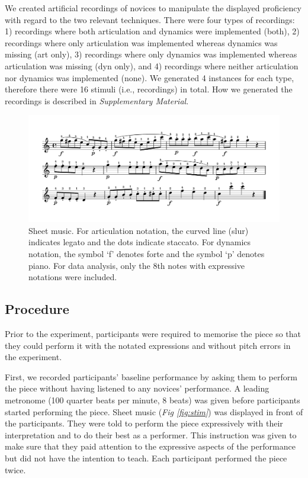 \documentclass[
  man,floatsintext]{apa6}
\begin{document}
We created artificial recordings of novices to manipulate the displayed proficiency with regard to the two relevant techniques. There were four types of recordings: 1) recordings where both articulation and dynamics were implemented (both), 2) recordings where only articulation was implemented whereas dynamics was missing (art only), 3) recordings where only dynamics was implemented whereas articulation was missing (dyn only), and 4) recordings where neither articulation nor dynamics was implemented (none). We generated 4 instances for each type, therefore there were 16 stimuli (i.e., recordings) in total. How we generated the recordings is described in \emph{Supplementary Material}.

\begin{figure}
\includegraphics[width=1\linewidth]{manuscript_files/figure-latex/stimli-1} \caption{\label{fig:stim}Sheet music. For articulation notation, the curved line (slur) indicates legato and the dots indicate staccato. For dynamics notation, the symbol `f' denotes forte and the symbol `p' denotes piano. For data analysis, only the 8th notes with expressive notations were included.}\label{fig:stimli}
\end{figure}

\hypertarget{procedure}{%
\subsection{Procedure}\label{procedure}}

Prior to the experiment, participants were required to memorise the piece so that they could perform it with the notated expressions and without pitch errors in the experiment.

First, we recorded participants' baseline performance by asking them to perform the piece without having listened to any novices' performance. A leading metronome (100 quarter beats per minute, 8 beats) was given before participants started performing the piece. Sheet music (\emph{Fig \ref{fig:stim}}) was displayed in front of the participants. They were told to perform the piece expressively with their interpretation and to do their best as a performer. This instruction was given to make sure that they paid attention to the expressive aspects of the performance but did not have the intention to teach. Each participant performed the piece twice.
\end{document}
